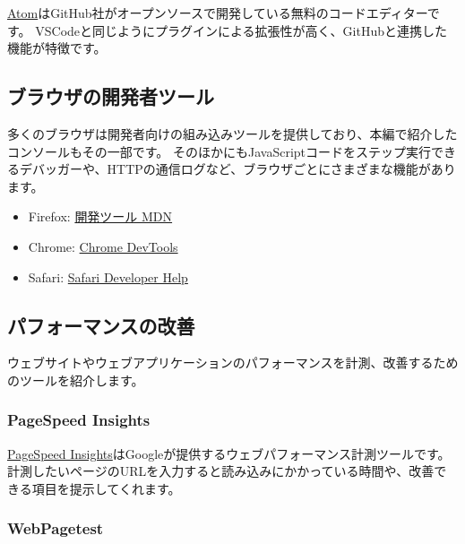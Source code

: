 \href{https://atom.io/}{Atom}はGitHub社がオープンソースで開発している無料のコードエディターです。
VSCodeと同じようにプラグインによる拡張性が高く、GitHubと連携した機能が特徴です。

\hypertarget{browser-devtools}{%
\subsection{ブラウザの開発者ツール}\label{browser-devtools}}

多くのブラウザは開発者向けの組み込みツールを提供しており、本編で紹介したコンソールもその一部です。
そのほかにもJavaScriptコードをステップ実行できるデバッガーや、HTTPの通信ログなど、ブラウザごとにさまざまな機能があります。

\begin{itemize}
\item
  Firefox: \href{https://developer.mozilla.org/ja/docs/Tools}{開発ツール
  \textbar{} MDN}
\item
  Chrome:
  \href{https://developers.google.com/web/tools/chrome-devtools/?hl=ja}{Chrome
  DevTools}
\item
  Safari:
  \href{https://support.apple.com/ja-jp/guide/safari-developer/welcome/mac}{Safari
  Developer Help}
\end{itemize}

\hypertarget{performance-improvement}{%
\subsection{パフォーマンスの改善}\label{performance-improvement}}

ウェブサイトやウェブアプリケーションのパフォーマンスを計測、改善するためのツールを紹介します。

\hypertarget{pagespeed}{%
\subsubsection{PageSpeed Insights}\label{pagespeed}}

\href{https://developers.google.com/speed/pagespeed/insights/}{PageSpeed
Insights}はGoogleが提供するウェブパフォーマンス計測ツールです。
計測したいページのURLを入力すると読み込みにかかっている時間や、改善できる項目を提示してくれます。

\hypertarget{webpagetest}{%
\subsubsection{WebPagetest}\label{webpagetest}}

